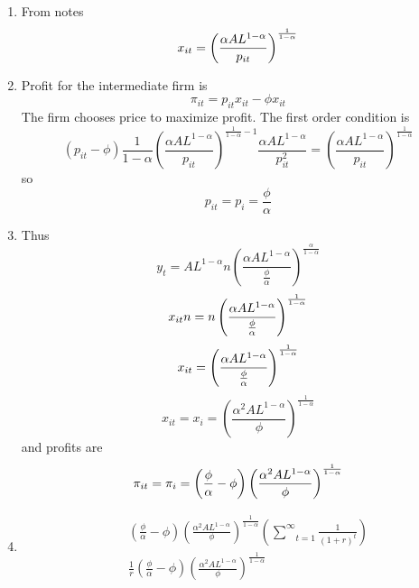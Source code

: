 \documentclass[11pt]{article}
\begin{document}
\begin{enumerate}
\item \bigskip From notes 
\begin{equation*}
x_{it}=\left( \frac{\alpha AL^{1-\alpha }}{p_{it}}\right) ^{\frac{1}{%
1-\alpha }}
\end{equation*}

\item Profit for the intermediate firm is 
\begin{equation*}
\pi _{it}=p_{it}x_{it}-\phi x_{it}
\end{equation*}%
The firm chooses price to maximize profit. The first order condition is%
\begin{equation*}
\left( p_{it}-\phi \right) \frac{1}{1-\alpha }\left( \frac{\alpha
AL^{1-\alpha }}{p_{it}}\right) ^{\frac{1}{1-\alpha }-1}\frac{\alpha
AL^{1-\alpha }}{p_{it}^{2}}=\left( \frac{\alpha AL^{1-\alpha }}{p_{it}}%
\right) ^{\frac{1}{1-\alpha }}
\end{equation*}%
so 
\begin{equation*}
p_{it}=p_{i}=\frac{\phi }{\alpha }
\end{equation*}

\item Thus%
\begin{equation*}
y_{t}=AL^{1-\alpha }n\left( \frac{\alpha AL^{1-\alpha }}{\frac{\phi }{\alpha 
}}\right) ^{\frac{\alpha }{1-\alpha }}
\end{equation*}%
\begin{equation*}
x_{it}n=n\left( \frac{\alpha AL^{1-\alpha }}{\frac{\phi }{\alpha }}\right) ^{%
\frac{1}{1-\alpha }}
\end{equation*}%
\begin{equation*}
x_{it}=\left( \frac{\alpha AL^{1-\alpha }}{\frac{\phi }{\alpha }}\right) ^{%
\frac{1}{1-\alpha }}
\end{equation*}%
\begin{equation*}
x_{it}=x_{i}=\left( \frac{\alpha ^{2}AL^{1-\alpha }}{\phi }\right) ^{\frac{1%
}{1-\alpha }}
\end{equation*}%
and profits are 
\begin{equation*}
\pi _{it}=\pi _{i}=\left( \frac{\phi }{\alpha }-\phi \right) \left( \frac{%
\alpha ^{2}AL^{1-\alpha }}{\phi }\right) ^{\frac{1}{1-\alpha }}
\end{equation*}

\item 
\begin{eqnarray*}
&&\left( \frac{\phi }{\alpha }-\phi \right) \left( \frac{\alpha
^{2}AL^{1-\alpha }}{\phi }\right) ^{\frac{1}{1-\alpha }}\left( \underset{t=1}%
{\overset{\infty }{\sum }}\frac{1}{\left( 1+r\right) ^{t}}\right) \\
&&\frac{1}{r}\left( \frac{\phi }{\alpha }-\phi \right) \left( \frac{\alpha
^{2}AL^{1-\alpha }}{\phi }\right) ^{\frac{1}{1-\alpha }}
\end{eqnarray*}


\end{enumerate}
\end{document}
